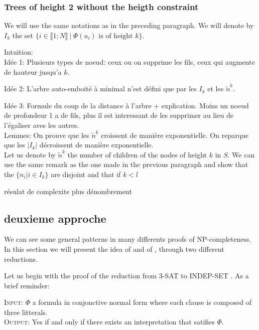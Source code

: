 \subsubsection{Trees of height 2 without the heigth constraint}
We will use the same notations as in the preceding paragraph. We will
denote by $I_{k}$ the set ${\{i \in \llbracket 1;N \rrbracket \ | \ 
\Phi(u_{i}) \text{ is of height } k \}}$. 

Intuition:\\
Idée 1: Plusieurs types de noeud: ceux ou on supprime les fils, ceux
qui augmente de hauteur jusqu'a $k$.

Idée 2: L'arbre auto-emboité à minimal n'est défini que par les
$I_{k}$ et les $\tilde{n}^{k}$.

Idée 3:
Formule du coup de la distance à l'arbre + explication. 
Moins un noeud de profondeur 1 a de fils, plus il est
interessant de les supprimer au lieu de l'égaliser aves les autres.\\

Lemmes: On prouve que les $\tilde{n}^k$ croissent de manière
exponentielle. On reparque que les $|I_{k}|$ décroissent de manière exponentielle.\\ 

Let us denote by $\tilde{n}^{k}$ the number of children of the nodes
of height $k$ in $S$. We can use the same remark as the one made in the
previous paragraph and show that the $\{n_{i} | i \in I_{k} \}$ are
disjoint and that if $k < l$  

résulat de complexite plus dénombrement

\subsection{deuxieme approche}
We can see some general patterns in many differents proofs of
NP-completeness. In this section we will present the idea of \widgets
and of \constraints, through two different reductions.

Let us begin with the proof of the reduction from 3-SAT to INDEP-SET
\cite{polytech}. As a brief reminder:

\begin{definition}[3-SAT]
\textsc{Input:} $\Phi$ a formula in conjonctive normal form where each
clause is composed of three litterals. \\
\textsc{Output:} Yes if and only if there exists an interpretation
that satifies $\Phi$.\\
\end{definition}

